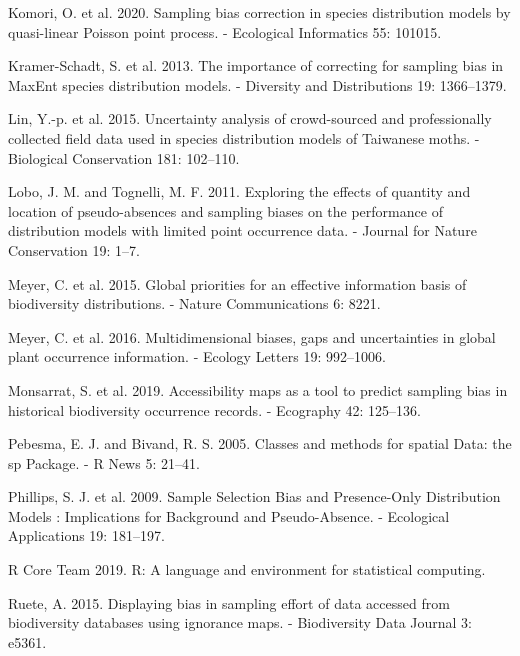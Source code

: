 \documentclass[
  12pt,
]{article}
\begin{document}
\leavevmode\hypertarget{ref-Komori2020}{}%
Komori, O. et al. 2020. Sampling bias correction in species distribution models by quasi-linear Poisson point process. - Ecological Informatics 55: 101015.

\leavevmode\hypertarget{ref-Kramer-Schadt2013}{}%
Kramer-Schadt, S. et al. 2013. The importance of correcting for sampling bias in MaxEnt species distribution models. - Diversity and Distributions 19: 1366--1379.

\leavevmode\hypertarget{ref-Lin2015}{}%
Lin, Y.-p. et al. 2015. Uncertainty analysis of crowd-sourced and professionally collected field data used in species distribution models of Taiwanese moths. - Biological Conservation 181: 102--110.

\leavevmode\hypertarget{ref-Lobo2011}{}%
Lobo, J. M. and Tognelli, M. F. 2011. Exploring the effects of quantity and location of pseudo-absences and sampling biases on the performance of distribution models with limited point occurrence data. - Journal for Nature Conservation 19: 1--7.

\leavevmode\hypertarget{ref-Meyer2015}{}%
Meyer, C. et al. 2015. Global priorities for an effective information basis of biodiversity distributions. - Nature Communications 6: 8221.

\leavevmode\hypertarget{ref-Meyer2016}{}%
Meyer, C. et al. 2016. Multidimensional biases, gaps and uncertainties in global plant occurrence information. - Ecology Letters 19: 992--1006.

\leavevmode\hypertarget{ref-Monsarrat2019}{}%
Monsarrat, S. et al. 2019. Accessibility maps as a tool to predict sampling bias in historical biodiversity occurrence records. - Ecography 42: 125--136.

\leavevmode\hypertarget{ref-Pebesma2005}{}%
Pebesma, E. J. and Bivand, R. S. 2005. Classes and methods for spatial Data: the sp Package. - R News 5: 21--41.

\leavevmode\hypertarget{ref-Phillips2009}{}%
Phillips, S. J. et al. 2009. Sample Selection Bias and Presence-Only Distribution Models : Implications for Background and Pseudo-Absence. - Ecological Applications 19: 181--197.

\leavevmode\hypertarget{ref-rcoreteam2019}{}%
R Core Team 2019. R: A language and environment for statistical computing.

\leavevmode\hypertarget{ref-Ruete2015}{}%
Ruete, A. 2015. Displaying bias in sampling effort of data accessed from biodiversity databases using ignorance maps. - Biodiversity Data Journal 3: e5361.
\end{document}
